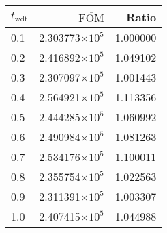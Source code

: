 \begin{tabular}{lrr}
\toprule
$t_{\mathrm{wdt}}$ & $\overline{\mathrm{FOM}}$ &    Ratio \\
\midrule
               0.1 &   2.303773$\times 10^{5}$ & 1.000000 \\
               0.2 &   2.416892$\times 10^{5}$ & 1.049102 \\
               0.3 &   2.307097$\times 10^{5}$ & 1.001443 \\
               0.4 &   2.564921$\times 10^{5}$ & 1.113356 \\
               0.5 &   2.444285$\times 10^{5}$ & 1.060992 \\
               0.6 &   2.490984$\times 10^{5}$ & 1.081263 \\
               0.7 &   2.534176$\times 10^{5}$ & 1.100011 \\
               0.8 &   2.355754$\times 10^{5}$ & 1.022563 \\
               0.9 &   2.311391$\times 10^{5}$ & 1.003307 \\
               1.0 &   2.407415$\times 10^{5}$ & 1.044988 \\
\bottomrule
\end{tabular}
